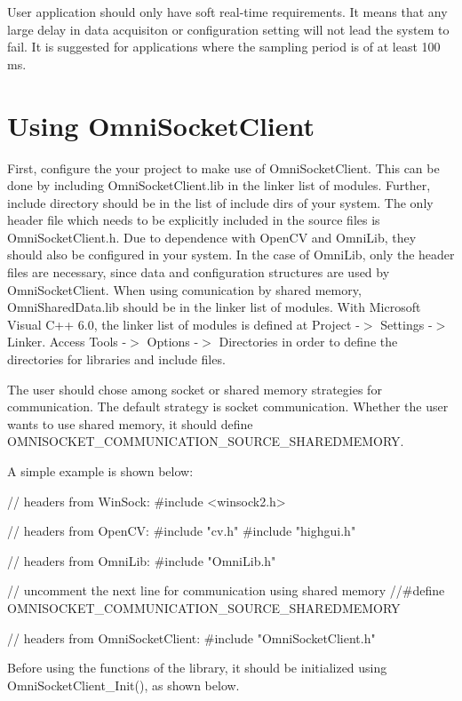 User application should only have soft real-\/time requirements. It means that any large delay in data acquisiton or configuration setting will not lead the system to fail. It is suggested for applications where the sampling period is of at least 100 ms.\hypertarget{main_use_sec}{}\section{Using OmniSocketClient}\label{main_use_sec}
First, configure the your project to make use of OmniSocketClient. This can be done by including OmniSocketClient.lib in the linker list of modules. Further, include directory should be in the list of include dirs of your system. The only header file which needs to be explicitly included in the source files is OmniSocketClient.h. Due to dependence with OpenCV and OmniLib, they should also be configured in your system. In the case of OmniLib, only the header files are necessary, since data and configuration structures are used by OmniSocketClient. When using comunication by shared memory, OmniSharedData.lib should be in the linker list of modules. With Microsoft Visual C++ 6.0, the linker list of modules is defined at Project -\/$>$ Settings -\/$>$ Linker. Access Tools -\/$>$ Options -\/$>$ Directories in order to define the directories for libraries and include files.

The user should chose among socket or shared memory strategies for communication. The default strategy is socket communication. Whether the user wants to use shared memory, it should define OMNISOCKET\_\-COMMUNICATION\_\-SOURCE\_\-SHAREDMEMORY.

A simple example is shown below:


\begin{DoxyCode}
        // headers from WinSock:
        #include <winsock2.h>

        // headers from OpenCV:
        #include "cv.h"
        #include "highgui.h"

        // headers from OmniLib:
        #include "OmniLib.h"

        // uncomment the next line for communication using shared memory
        //#define OMNISOCKET_COMMUNICATION_SOURCE_SHAREDMEMORY  

        // headers from OmniSocketClient:
        #include "OmniSocketClient.h"
\end{DoxyCode}


Before using the functions of the library, it should be initialized using OmniSocketClient\_\-Init(), as shown below.



